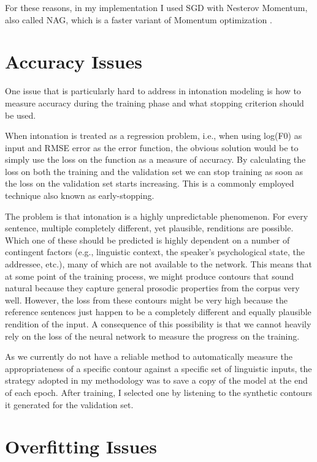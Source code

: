 For these reasons, in my implementation I used \ac{SGD} with Nesterov Momentum, also called \ac{NAG}, which is a faster variant of Momentum optimization \citep{Nesterov1983method}.


\section{Accuracy Issues}

One issue that is particularly hard to address in intonation modeling is how to measure accuracy during the training phase and what stopping criterion should be used.

When intonation is treated as a regression problem, i.e., when using log(\ac{F0}) as input and \ac{RMSE} error as the error function, the obvious solution would be to simply use the loss on the function as a measure of accuracy.
By calculating the loss on both the training and the validation set we can stop training as soon as the loss on the validation set starts increasing.
This is a commonly employed technique also known as early-stopping.

The problem is that intonation is a highly unpredictable phenomenon.
For every sentence, multiple completely different, yet plausible, renditions are possible.
Which one of these should be predicted is highly dependent on a number of contingent factors (e.g., linguistic context, the speaker's psychological state,  the addressee, etc.), many of which are not available to the network. 
This means that at some point of the training process, we might produce contours that sound natural because they capture general prosodic properties from the corpus very well.
However, the loss from these contours might be very high because the reference sentences just happen to be a completely different and equally plausible rendition of the input.
A consequence of this possibility is that we cannot heavily rely on the loss of the neural network to measure the progress on the training.


As we currently do not have a reliable method to automatically measure the appropriateness of a specific contour against a specific set of linguistic inputs, the strategy adopted in my methodology was to save a copy of the model at the end of each epoch.
After training, I selected one by listening to the synthetic contours it generated for the validation set.



\section{Overfitting Issues}

